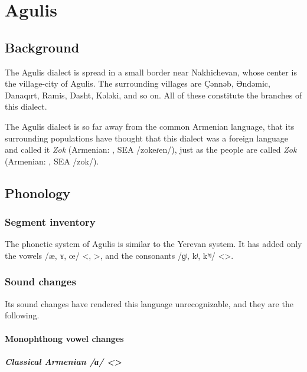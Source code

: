 \chapter{Agulis}\label{chapter:Agulis}

\section{Background}
\begin{adjarianpage}\label{page:92}\end{adjarianpage}%


The Agulis dialect is spread in a small border near Nakhichevan, whose center is the village-city of Agulis. The surrounding villages are Çənnəb, Əndəmic, Danaqırt, Ramis, Dasht, Kələki, and so on. All of these constitute the branches of this dialect. 

The Agulis dialect is so far away from the common Armenian language, that its surrounding populations have thought that this dialect was a foreign language and called it \textit{Zok} (Armenian: , SEA /zokeɾen/), just as the people are called \textit{Zok} (Armenian: , SEA /zok/).

\section{Phonology}
\subsection{Segment inventory}\label{sec:Agulis:phono:segment}

The phonetic system of Agulis is similar to the Yerevan system. It has added only the vowels /æ, ʏ, œ/ <, >, and the consonants /ɡʲ, kʲ, kʰʲ/ <>. 
\subsection{Sound changes}
Its sound changes have rendered this language unrecognizable, and they are the following. 

\subsubsection{Monophthong vowel changes}

\paragraph{Classical Armenian /ɑ/ <>}

